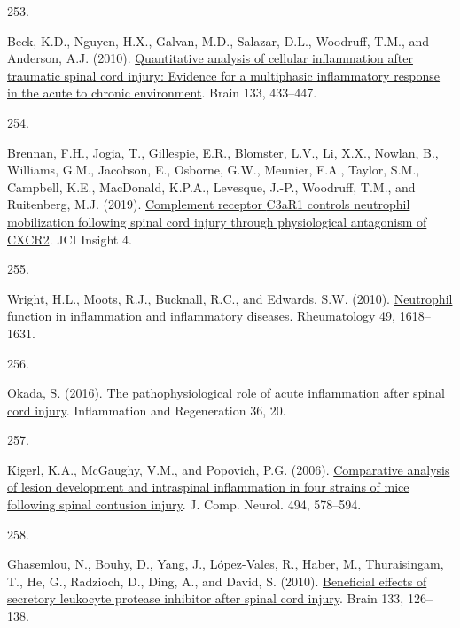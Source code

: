 \documentclass[
]{article}
\newlength{\cslhangindent}
\newlength{\csllabelwidth}
\newlength{\cslentryspacingunit} %
\newenvironment{CSLReferences}[2] %
 {%
  \setlength{\parindent}{0pt}
  \ifodd #1
  \let\oldpar\par
  \def\par{\hangindent=\cslhangindent\oldpar}
  \fi
  \setlength{\parskip}{#2\cslentryspacingunit}
 }%
 {}
\newcommand{\CSLLeftMargin}[1]{\parbox[t]{\csllabelwidth}{#1}}
\newcommand{\CSLRightInline}[1]{\parbox[t]{\linewidth - \csllabelwidth}{#1}\break}
\begin{document}
\begin{CSLReferences}{0}{0}
\leavevmode{}%
\CSLLeftMargin{253. }
\CSLRightInline{Beck, K.D., Nguyen, H.X., Galvan, M.D., Salazar, D.L., Woodruff, T.M., and Anderson, A.J. (2010). \href{https://doi.org/10.1093/brain/awp322}{Quantitative analysis of cellular inflammation after traumatic spinal cord injury: Evidence for a multiphasic inflammatory response in the acute to chronic environment}. Brain 133, 433--447.}

\leavevmode{}%
\CSLLeftMargin{254. }
\CSLRightInline{Brennan, F.H., Jogia, T., Gillespie, E.R., Blomster, L.V., Li, X.X., Nowlan, B., Williams, G.M., Jacobson, E., Osborne, G.W., Meunier, F.A., Taylor, S.M., Campbell, K.E., MacDonald, K.P.A., Levesque, J.-P., Woodruff, T.M., and Ruitenberg, M.J. (2019). \href{https://doi.org/10.1172/jci.insight.98254}{Complement receptor {C3aR1} controls neutrophil mobilization following spinal cord injury through physiological antagonism of {CXCR2}}. JCI Insight 4.}

\leavevmode{}%
\CSLLeftMargin{255. }
\CSLRightInline{Wright, H.L., Moots, R.J., Bucknall, R.C., and Edwards, S.W. (2010). \href{https://doi.org/10.1093/rheumatology/keq045}{Neutrophil function in inflammation and inflammatory diseases}. Rheumatology 49, 1618--1631.}

\leavevmode{}%
\CSLLeftMargin{256. }
\CSLRightInline{Okada, S. (2016). \href{https://doi.org/10.1186/s41232-016-0026-1}{The pathophysiological role of acute inflammation after spinal cord injury}. Inflammation and Regeneration 36, 20.}

\leavevmode{}%
\CSLLeftMargin{257. }
\CSLRightInline{Kigerl, K.A., McGaughy, V.M., and Popovich, P.G. (2006). \href{https://doi.org/10.1002/cne.20827}{Comparative analysis of lesion development and intraspinal inflammation in four strains of mice following spinal contusion injury}. J. Comp. Neurol. 494, 578--594.}

\leavevmode{}%
\CSLLeftMargin{258. }
\CSLRightInline{Ghasemlou, N., Bouhy, D., Yang, J., López-Vales, R., Haber, M., Thuraisingam, T., He, G., Radzioch, D., Ding, A., and David, S. (2010). \href{https://doi.org/10.1093/brain/awp304}{Beneficial effects of secretory leukocyte protease inhibitor after spinal cord injury}. Brain 133, 126--138.}


\end{CSLReferences}
\end{document}
